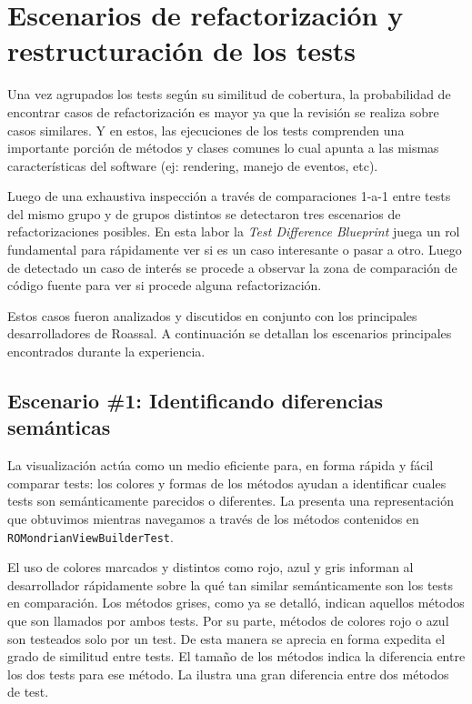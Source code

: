 \section{Escenarios de refactorización y restructuración de los tests}

\par Una vez agrupados los tests según su similitud de cobertura, la probabilidad de encontrar casos de refactorización es mayor ya que la revisión se realiza sobre casos similares. Y en estos, las ejecuciones de los tests comprenden una importante porción de métodos y clases comunes lo cual apunta a las mismas características del software (ej: rendering, manejo de eventos, etc). 

\par Luego de una exhaustiva inspección a través de comparaciones 1-a-1 entre tests del mismo grupo y de grupos distintos se detectaron tres escenarios de refactorizaciones posibles. En esta labor la \emph{Test Difference Blueprint} juega un rol fundamental para rápidamente ver si es un caso interesante o pasar a otro. Luego de detectado un caso de interés se procede  a observar la zona de comparación de código fuente para ver si procede alguna refactorización.

\par Estos casos fueron analizados y discutidos en conjunto con los principales desarrolladores de Roassal. A continuación se detallan los escenarios principales encontrados durante la experiencia.


\subsection{Escenario \#1: Identificando diferencias semánticas}

\par La visualización actúa como un medio eficiente para, en forma rápida y fácil comparar tests: los colores y formas de los métodos ayudan a identificar cuales tests son semánticamente parecidos o diferentes.
La  presenta una representación que obtuvimos mientras navegamos a través de los métodos contenidos en {\tt ROMondrianViewBuilderTest}. 

\par El uso de colores marcados y distintos como rojo, azul y gris informan al desarrollador rápidamente sobre la qué tan similar semánticamente son los tests en comparación. Los métodos grises, como ya se detalló, indican aquellos métodos que son llamados por ambos tests. Por su parte, métodos de colores rojo o azul son testeados solo por un test. De esta manera se aprecia en forma expedita el grado de similitud entre tests. El tamaño de los métodos indica la diferencia entre los dos tests para ese método. La  ilustra una gran diferencia entre dos métodos de test.

